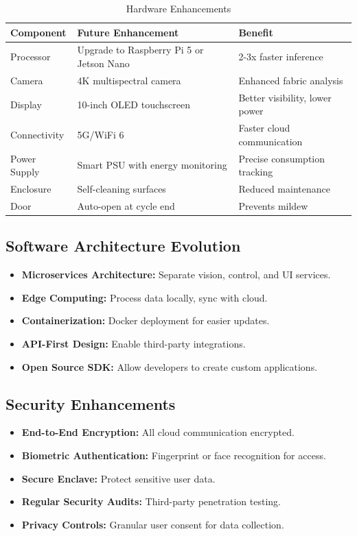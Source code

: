 \begin{table}[H]
    \centering
    \small
    \begin{tabular}{|l|l|l|}
        \hline
        \textbf{Component} & \textbf{Future Enhancement} & \textbf{Benefit} \\
        \hline
        Processor & Upgrade to Raspberry Pi 5 or Jetson Nano & 2-3x faster inference \\
        \hline
        Camera & 4K multispectral camera & Enhanced fabric analysis \\
        \hline
        Display & 10-inch OLED touchscreen & Better visibility, lower power \\
        \hline
        Connectivity & 5G/WiFi 6 & Faster cloud communication \\
        \hline
        Power Supply & Smart PSU with energy monitoring & Precise consumption tracking \\
        \hline
        Enclosure & Self-cleaning surfaces & Reduced maintenance \\
        \hline
        Door & Auto-open at cycle end & Prevents mildew \\
        \hline
    \end{tabular}
    \caption{Hardware Enhancements}
    \label{tab:hardware-enhancements}
\end{table}

\subsection{Software Architecture Evolution}
\begin{itemize}
    \item \textbf{Microservices Architecture:} Separate vision, control, and UI services.
    \item \textbf{Edge Computing:} Process data locally, sync with cloud.
    \item \textbf{Containerization:} Docker deployment for easier updates.
    \item \textbf{API-First Design:} Enable third-party integrations.
    \item \textbf{Open Source SDK:} Allow developers to create custom applications.
\end{itemize}

\subsection{Security Enhancements}
\begin{itemize}
    \item \textbf{End-to-End Encryption:} All cloud communication encrypted.
    \item \textbf{Biometric Authentication:} Fingerprint or face recognition for access.
    \item \textbf{Secure Enclave:} Protect sensitive user data.
    \item \textbf{Regular Security Audits:} Third-party penetration testing.
    \item \textbf{Privacy Controls:} Granular user consent for data collection.
\end{itemize}

